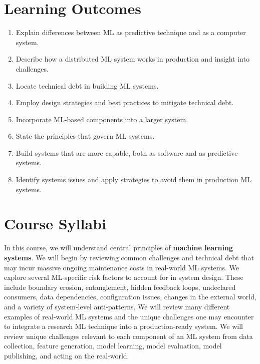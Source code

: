 \documentclass[11pt]{article}
\begin{document}
\section*{Learning Outcomes}
\begin{enumerate}
\item Explain differences between ML as predictive technique and as a computer system.

\item Describe how a distributed ML system works in production and insight into challenges.

\item Locate technical debt in building ML systems.

\item Employ design strategies and best practices to mitigate technical debt.

\item Incorporate ML-based components into a larger system.


\item State the principles that govern ML systems.

\item Build systems that are more capable, both as software and as predictive systems.

\item Identify systems issues and apply strategies to avoid them in production ML systems.

\end{enumerate}


\section*{Course Syllabi}

In this course, we will understand central principles of \textbf{machine learning systems}. We will begin by reviewing common challenges and technical debt that may incur massive ongoing maintenance costs in real-world ML systems. We explore several ML-specific risk factors to account for in system design. These include boundary erosion, entanglement, hidden feedback loops, undeclared consumers, data dependencies, configuration issues, changes in the external world, and a variety of system-level anti-patterns. We will review many different examples of real-world ML systems and the unique challenges one may encounter to integrate a research ML technique into a production-ready system. We will review unique challenges relevant to each component of an ML system from data collection, feature generation, model learning, model evaluation, model publishing, and acting on the real-world. 
\end{document}
